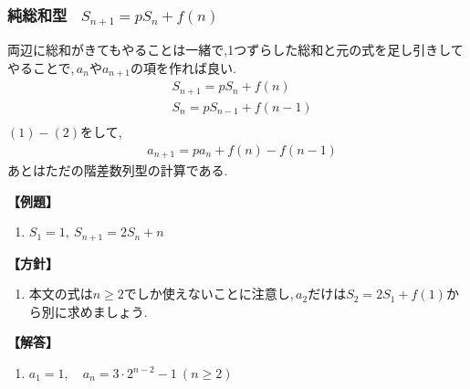   \subsubsection{純総和型 \, $S_{n+1}=pS_n+f(n) $}
    両辺に総和がきてもやることは一緒で,1つずらした総和と元の式を足し引きしてやることで,\,$a_n$や$a_{n+1}$の項を作れば良い.
    \begin{align*}
      &S_{n+1}=pS_n+f(n) \tag*{\(\cdots\) (1)}\\
      &S_{n}=pS_{n-1}+f(n-1) \tag*{\(\cdots\) (2)}\\
    \end{align*}
      $(1)-(2)$をして,
    \begin{align*}
      &a_{n+1}=pa_{n}+f(n)-f(n-1)
    \end{align*}
    あとはただの階差数列型の計算である.

    \noindent \textbf{【例題】}
    \begin{enumerate}[label=(\arabic*),parsep=3pt]
      \item $\displaystyle S_1=1,\ S_{n+1}=2S_n+n$
    \end{enumerate}

    \noindent\textbf{【方針】}
    \begin{enumerate}[label=(\arabic*),parsep=3pt]
      \item 本文の式は$n\ge2$でしか使えないことに注意し,\,$a_2$だけは$S_2=2S_1+f(1)$から別に求めましょう.
    \end{enumerate}

    \noindent\textbf{【解答】}
    \begin{enumerate}[label=(\arabic*),parsep=3pt]
      \item $\displaystyle a_1=1,\quad a_n=3\cdot2^{n-2}-1\ (n\ge2)$
    \end{enumerate}

